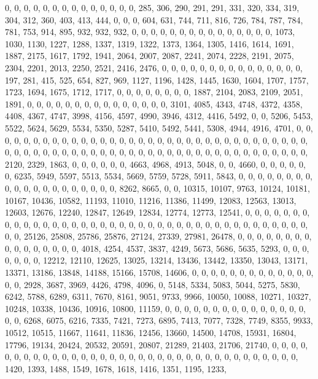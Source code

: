 \documentclass[
]{article}
\begin{document}
0, 0, 0, 0, 0, 0, 0, 0, 0, 0, 0, 0, 0, 0, 285, 306, 290, 291, 291, 331,
320, 334, 319, 304, 312, 360, 403, 413, 444, 0, 0, 0, 604, 631, 744,
711, 816, 726, 784, 787, 784, 781, 753, 914, 895, 932, 932, 932, 0, 0,
0, 0, 0, 0, 0, 0, 0, 0, 0, 0, 0, 0, 0, 1073, 1030, 1130, 1227, 1288,
1337, 1319, 1322, 1373, 1364, 1305, 1416, 1614, 1691, 1887, 2175, 1617,
1792, 1941, 2064, 2007, 2087, 2241, 2074, 2228, 2191, 2075, 2304, 2201,
2013, 2250, 2521, 2416, 2476, 0, 0, 0, 0, 0, 0, 0, 0, 0, 0, 0, 0, 0, 0,
0, 197, 281, 415, 525, 654, 827, 969, 1127, 1196, 1428, 1445, 1630,
1604, 1707, 1757, 1723, 1694, 1675, 1712, 1717, 0, 0, 0, 0, 0, 0, 0, 0,
1887, 2104, 2083, 2109, 2051, 1891, 0, 0, 0, 0, 0, 0, 0, 0, 0, 0, 0, 0,
0, 0, 0, 3101, 4085, 4343, 4748, 4372, 4358, 4408, 4367, 4747, 3998,
4156, 4597, 4990, 3946, 4312, 4416, 5492, 0, 0, 5206, 5453, 5522, 5624,
5629, 5534, 5350, 5287, 5410, 5492, 5441, 5308, 4944, 4916, 4701, 0, 0,
0, 0, 0, 0, 0, 0, 0, 0, 0, 0, 0, 0, 0, 0, 0, 0, 0, 0, 0, 0, 0, 0, 0, 0,
0, 0, 0, 0, 0, 0, 0, 0, 0, 0, 0, 0, 0, 0, 0, 0, 0, 0, 0, 0, 0, 0, 0, 0,
0, 0, 0, 0, 0, 0, 0, 0, 0, 0, 0, 0, 0, 0, 0, 0, 2120, 2329, 1863, 0, 0,
0, 0, 0, 0, 4663, 4968, 4913, 5048, 0, 0, 4660, 0, 0, 0, 0, 0, 0, 6235,
5949, 5597, 5513, 5534, 5669, 5759, 5728, 5911, 5843, 0, 0, 0, 0, 0, 0,
0, 0, 0, 0, 0, 0, 0, 0, 0, 0, 0, 0, 0, 0, 8262, 8665, 0, 0, 10315,
10107, 9763, 10124, 10181, 10167, 10436, 10582, 11193, 11010, 11216,
11386, 11499, 12083, 12563, 13013, 12603, 12676, 12240, 12847, 12649,
12834, 12774, 12773, 12541, 0, 0, 0, 0, 0, 0, 0, 0, 0, 0, 0, 0, 0, 0, 0,
0, 0, 0, 0, 0, 0, 0, 0, 0, 0, 0, 0, 0, 0, 0, 0, 0, 0, 0, 0, 0, 0, 0, 0,
0, 0, 25126, 25808, 25786, 25876, 27124, 27339, 27981, 26478, 0, 0, 0,
0, 0, 0, 0, 0, 0, 0, 0, 0, 0, 0, 0, 0, 4018, 4254, 4537, 3837, 4249,
5673, 5686, 5635, 5293, 0, 0, 0, 0, 0, 0, 0, 12212, 12110, 12625, 13025,
13214, 13436, 13442, 13350, 13043, 13171, 13371, 13186, 13848, 14188,
15166, 15708, 14606, 0, 0, 0, 0, 0, 0, 0, 0, 0, 0, 0, 0, 0, 0, 0, 2928,
3687, 3969, 4426, 4798, 4096, 0, 5148, 5334, 5083, 5044, 5275, 5830,
6242, 5788, 6289, 6311, 7670, 8161, 9051, 9733, 9966, 10050, 10088,
10271, 10327, 10248, 10338, 10436, 10916, 10800, 11159, 0, 0, 0, 0, 0,
0, 0, 0, 0, 0, 0, 0, 0, 0, 0, 0, 0, 6268, 6075, 6216, 7335, 7421, 7273,
6895, 7413, 7077, 7328, 7749, 8355, 9933, 10512, 10515, 11667, 11641,
11836, 12456, 13660, 14500, 14708, 15931, 16804, 17796, 19134, 20424,
20532, 20591, 20807, 21289, 21403, 21706, 21740, 0, 0, 0, 0, 0, 0, 0, 0,
0, 0, 0, 0, 0, 0, 0, 0, 0, 0, 0, 0, 0, 0, 0, 0, 0, 0, 0, 0, 0, 0, 0, 0,
0, 0, 0, 1420, 1393, 1488, 1549, 1678, 1618, 1416, 1351, 1195, 1233,
\end{document}
